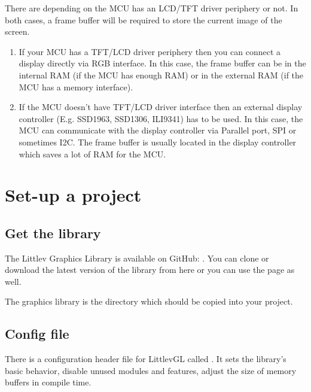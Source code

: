 \documentclass[letterpaper,10pt,english]{sphinxmanual}
\begin{document}
There are  depending on the MCU has an LCD/TFT driver periphery or not. In both cases, a frame buffer will be required to store the current image of the screen.
\begin{enumerate}
\item {} 
If your MCU has a TFT/LCD driver periphery then you can connect a display directly via RGB interface.
In this case, the frame buffer can be in the internal RAM (if the MCU has enough RAM) or in the external RAM (if the MCU has a memory interface).

\item {} 
If the MCU doesn’t have TFT/LCD driver interface then an external display controller (E.g. SSD1963, SSD1306, ILI9341) has to be used.
In this case, the MCU can communicate with the display controller via Parallel port, SPI or sometimes I2C.
The frame buffer is usually located in the display controller which saves a lot of RAM for the MCU.

\end{enumerate}


\section{Set-up a project}
\label{\detokenize{porting/project::doc}}\label{\detokenize{porting/project:set-up-a-project}}

\subsection{Get the library}
\label{\detokenize{porting/project:get-the-library}}
The Littlev Graphics Library is available on GitHub: .
You can clone or download the latest version of the library from here or you can use the  page as well.

The graphics library is the  directory which should be copied into your project.


\subsection{Config file}
\label{\detokenize{porting/project:config-file}}
There is a configuration header file for LittlevGL called . It sets the library’s basic behavior, disable unused modules and features, adjust the size of memory buffers in compile time.
\end{document}
